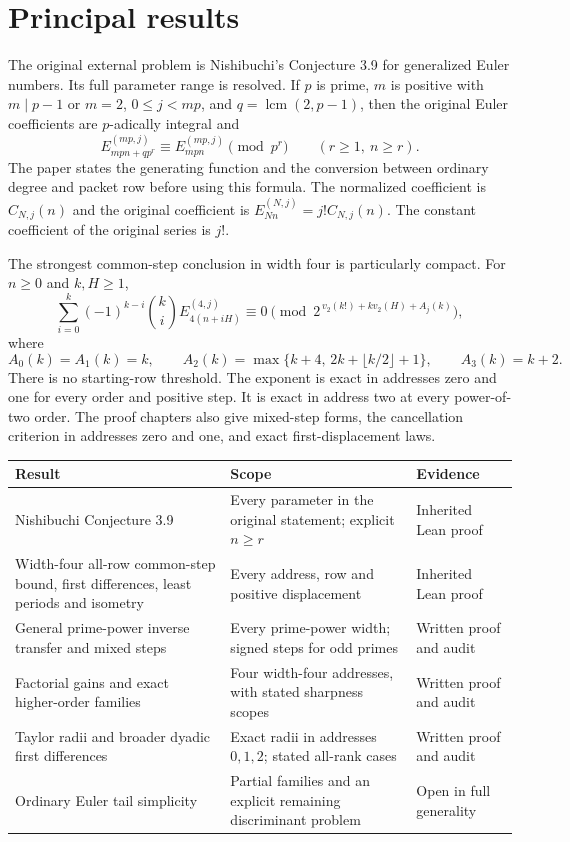 \section*{Principal results}
The original external problem is Nishibuchi's Conjecture 3.9 for generalized Euler numbers. Its full parameter range is resolved. If $p$ is prime, $m$ is positive with $m\mid p-1$ or $m=2$, $0\le j<mp$, and $q=\operatorname{lcm}(2,p-1)$, then the original Euler coefficients are $p$-adically integral and
\[
 E_{mpn+qp^r}^{(mp,j)}\equiv E_{mpn}^{(mp,j)}\pmod{p^r}
 \qquad (r\ge1,\ n\ge r).
\]
The paper states the generating function and the conversion between ordinary degree and packet row before using this formula. The normalized coefficient is $C_{N,j}(n)$ and the original coefficient is $E_{Nn}^{(N,j)}=j!C_{N,j}(n)$. The constant coefficient of the original series is $j!$.

The strongest common-step conclusion in width four is particularly compact. For $n\ge0$ and $k,H\ge1$,
\begin{equation*}
 \sum_{i=0}^k(-1)^{k-i}\binom ki E_{4(n+iH)}^{(4,j)}
 \equiv0\pmod{2^{\,v_2(k!)+kv_2(H)+A_j(k)}},
\end{equation*}
where
\[
 A_0(k)=A_1(k)=k,\qquad
 A_2(k)=\max\{k+4,\,2k+\lfloor k/2\rfloor+1\},\qquad
 A_3(k)=k+2.
\]
There is no starting-row threshold. The exponent is exact in addresses zero and one for every order and positive step. It is exact in address two at every power-of-two order. The proof chapters also give mixed-step forms, the cancellation criterion in addresses zero and one, and exact first-displacement laws.

\begin{center}
\small
\begin{tabularx}{\linewidth}{@{}>{\raggedright\arraybackslash}p{.29\linewidth}>{\raggedright\arraybackslash}X>{\raggedright\arraybackslash}p{.21\linewidth}@{}}
\toprule
Result & Scope & Evidence\\
\midrule
Nishibuchi Conjecture 3.9 & Every parameter in the original statement; explicit $n\ge r$ & Inherited Lean proof\\
Width-four all-row common-step bound, first differences, least periods and isometry & Every address, row and positive displacement & Inherited Lean proof\\
General prime-power inverse transfer and mixed steps & Every prime-power width; signed steps for odd primes & Written proof and audit\\
Factorial gains and exact higher-order families & Four width-four addresses, with stated sharpness scopes & Written proof and audit\\
Taylor radii and broader dyadic first differences & Exact radii in addresses $0,1,2$; stated all-rank cases & Written proof and audit\\
Ordinary Euler tail simplicity & Partial families and an explicit remaining discriminant problem & Open in full generality\\
\bottomrule
\end{tabularx}
\end{center}

